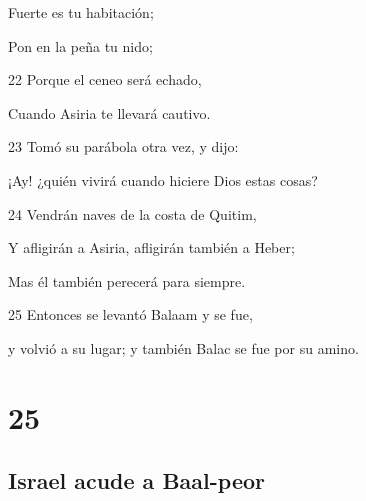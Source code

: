 \par Fuerte es tu habitación; 
\par Pon en la peña tu nido; 
\par 22 Porque el ceneo será echado, 
\par Cuando Asiria te llevará cautivo. 
\par 23 Tomó su parábola otra vez, y dijo: 
\par ¡Ay! ¿quién vivirá cuando hiciere Dios estas cosas? 
\par 24 Vendrán naves de la costa de Quitim, 
\par Y afligirán a Asiria, afligirán también a Heber; 
\par Mas él también perecerá para siempre. 
\par 25 Entonces se levantó Balaam y se fue, 
\par y volvió a su lugar; y también Balac se fue por su amino.

\chapter{25}

\section*{Israel acude a Baal-peor }

